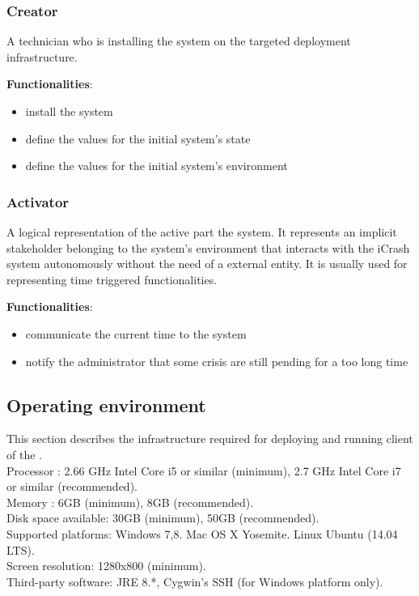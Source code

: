 \subsubsection{Creator}
A technician who is installing the \mysystemname system on the targeted
deployment infrastructure.

\textbf{Functionalities}:

\begin{itemize}
  \item install the \mysystemname system
  \item define the values for the initial system’s state
  \item define the values for the initial system’s environment
\end{itemize}

\subsubsection{Activator}
A logical representation of the active part the \mysystemname system.
It represents an implicit stakeholder belonging to the system’s environment
that interacts with the iCrash system autonomously without the need of a
external entity. It is usually used for representing time triggered functionalities.

\textbf{Functionalities}:

\begin{itemize}
  \item communicate the current time to the system
  \item notify the administrator that some crisis are still pending for a too
  long time
\end{itemize}

\subsection{Operating environment}
This section describes the infrastructure required for deploying and running
client of the \mysystemname.\\

Processor : 2.66 GHz Intel  Core i5 or similar (minimum), 2.7 GHz Intel  Core i7
or similar (recommended).\\
Memory : 6GB (minimum), 8GB (recommended).\\
Disk space available: 30GB (minimum), 50GB (recommended).\\
Supported platforms: Windows 7,8. Mac OS X Yosemite. Linux Ubuntu (14.04 LTS).\\
Screen resolution: 1280x800 (minimum).\\
Third-party software: JRE 8.*, Cygwin's SSH (for Windows platform only).

